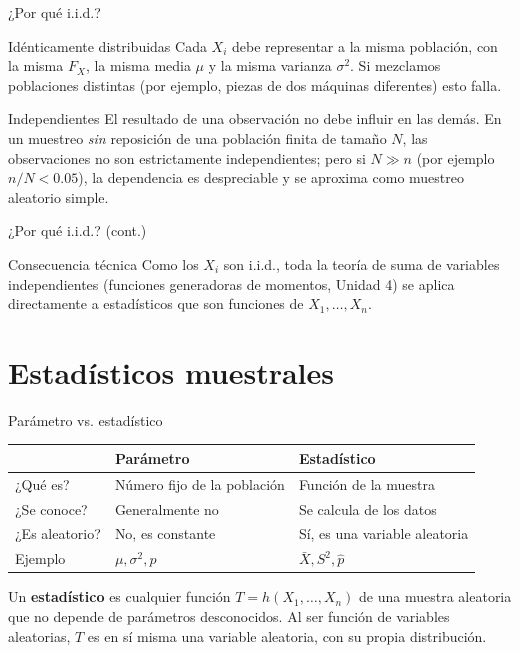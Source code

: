 \documentclass[aspectratio=169,11pt]{beamer}
\begin{document}
\begin{frame}{¿Por qué i.i.d.?}
\begin{block}{Idénticamente distribuidas}
Cada $X_i$ debe representar a la misma población, con la misma $F_X$, la misma media $\mu$ y la misma varianza $\sigma^2$. Si mezclamos poblaciones distintas (por ejemplo, piezas de dos máquinas diferentes) esto falla.
\end{block}

\begin{block}{Independientes}
El resultado de una observación no debe influir en las demás. En un muestreo \emph{sin} reposición de una población finita de tamaño $N$, las observaciones no son estrictamente independientes; pero si $N \gg n$ (por ejemplo $n/N < 0.05$), la dependencia es despreciable y se aproxima como muestreo aleatorio simple.
\end{block}

\end{frame}

\begin{frame}{¿Por qué i.i.d.? (cont.)}
\begin{alertblock}{Consecuencia técnica}
Como los $X_i$ son i.i.d., toda la teoría de suma de variables independientes (funciones generadoras de momentos, Unidad 4) se aplica directamente a estadísticos que son funciones de $X_1,\dots,X_n$.
\end{alertblock}
\end{frame}

\section{Estadísticos muestrales}

\begin{frame}{Parámetro vs. estadístico}
\begin{center}
\begin{tabular}{lll}
\toprule
 & \textbf{Parámetro} & \textbf{Estadístico} \\
\midrule
¿Qué es? & Número fijo de la población & Función de la muestra \\
¿Se conoce? & Generalmente no & Se calcula de los datos \\
¿Es aleatorio? & No, es constante & Sí, es una variable aleatoria \\
Ejemplo & $\mu, \sigma^2, p$ & $\bar X, S^2, \hat p$ \\
\bottomrule
\end{tabular}
\end{center}

\begin{definition}[Estadístico]
Un \textbf{estadístico} es cualquier función $T = h(X_1,\dots,X_n)$ de una muestra aleatoria que no depende de parámetros desconocidos. Al ser función de variables aleatorias, $T$ es en sí misma una variable aleatoria, con su propia distribución.
\end{definition}
\end{frame}
\end{document}
